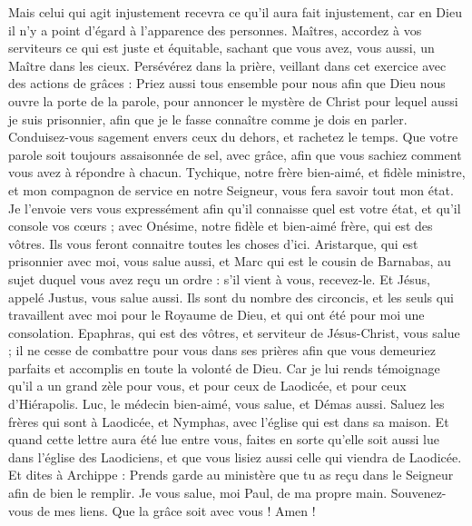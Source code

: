 \begin{multicols}{2}
Mais celui qui agit injustement recevra ce qu'il aura fait injustement, car en Dieu il n'y a point d'égard à l'apparence des personnes.
\VerseOne{}Maîtres, accordez à vos serviteurs ce qui est juste et équitable, sachant que vous avez, vous aussi, un Maître dans les cieux.
Persévérez dans la prière, veillant dans cet exercice avec des actions de grâces :
Priez aussi tous ensemble pour nous afin que Dieu nous ouvre la porte de la parole, pour annoncer le mystère de Christ pour lequel aussi je suis prisonnier, 
afin que je le fasse connaître comme je dois en parler.
Conduisez-vous sagement envers ceux du dehors, et rachetez le temps.
Que votre parole soit toujours assaisonnée de sel, avec grâce, afin que vous sachiez comment vous avez à répondre à chacun.
Tychique, notre frère bien-aimé, et fidèle ministre, et mon compagnon de service en notre Seigneur, vous fera savoir tout mon état.
Je l'envoie vers vous expressément afin qu'il connaisse quel est votre état, et qu'il console vos cœurs ;
avec Onésime, notre fidèle et bien-aimé frère, qui est des vôtres. Ils vous feront connaitre toutes les choses d'ici.
Aristarque, qui est prisonnier avec moi, vous salue aussi, et Marc qui est le cousin de Barnabas, au sujet duquel vous avez reçu un ordre : s'il vient à vous, recevez-le.
Et Jésus, appelé Justus, vous salue aussi. Ils sont du nombre des circoncis, et les seuls qui travaillent avec moi pour le Royaume de Dieu, et qui ont été pour moi une consolation.
Epaphras, qui est des vôtres, et serviteur de Jésus-Christ, vous salue ; il ne cesse de combattre pour vous dans ses prières afin que vous demeuriez parfaits et accomplis en toute la volonté de Dieu.
Car je lui rends témoignage qu'il a un grand zèle pour vous, et pour ceux de Laodicée, et pour ceux d'Hiérapolis.
Luc, le médecin bien-aimé, vous salue, et Démas aussi.
Saluez les frères qui sont à Laodicée, et Nymphas, avec l'église qui est dans sa maison.
Et quand cette lettre aura été lue entre vous, faites en sorte qu'elle soit aussi lue dans l'église des Laodiciens, et que vous lisiez aussi celle qui viendra de Laodicée.
Et dites à Archippe : Prends garde au ministère que tu as reçu dans le Seigneur afin de bien le remplir.
Je vous salue, moi Paul, de ma propre main. Souvenez-vous de mes liens. Que la grâce soit avec vous ! Amen !
\PPE{}
\end{multicols}
